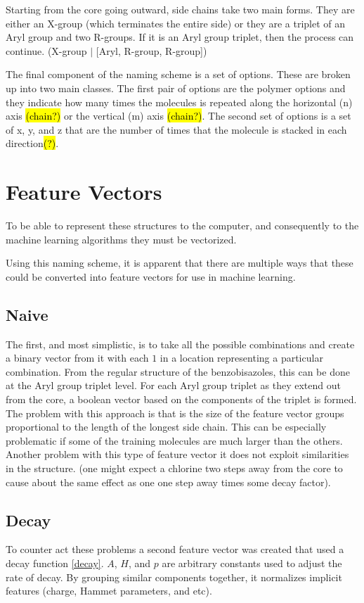 \documentclass[10pt]{article}
\begin{document}
Starting from the core going outward, side chains take two main forms. They are either an X-group (which terminates the entire side) or they are a triplet of an Aryl group and two R-groups. If it is an Aryl group triplet, then the process can continue. (X-group $\vert$ [Aryl, R-group, R-group])

The final component of the naming scheme is a set of options. These are broken up into two main classes. The first pair of options are the polymer options and they indicate how many times the molecules is repeated along the horizontal (n) axis \hl{(chain?)} or the vertical (m) axis \hl{(chain?)}. The second set of options is a set of x, y, and z that are the number of times that the molecule is stacked in each direction\hl{(?)}.


\section{Feature Vectors}

To be able to represent these structures to the computer, and consequently to the machine learning algorithms they must be vectorized.

Using this naming scheme, it is apparent that there are multiple ways that these could be converted into feature vectors for use in machine learning.


\subsection{Naive}

The first, and most simplistic, is to take all the possible combinations and create a binary vector from it with each $1$ in a location representing a particular combination. From the regular structure of the benzobisazoles, this can be done at the Aryl group triplet level. For each Aryl group triplet as they extend out from the core, a boolean vector based on the components of the triplet is formed. The problem with this approach is that is the size of the feature vector groups proportional to the length of the longest side chain. This can be especially problematic if some of the training molecules are much larger than the others. Another problem with this type of feature vector it does not exploit similarities in the structure. (one might expect a chlorine two steps away from the core to cause about the same effect as one one step away times some decay factor).


\subsection{Decay}
To counter act these problems a second feature vector was created that used a decay function \eqref{decay}. $A$, $H$, and $p$ are arbitrary constants used to adjust the rate of decay. By grouping similar components together, it normalizes implicit features (charge, Hammet parameters, and etc).
\end{document}
